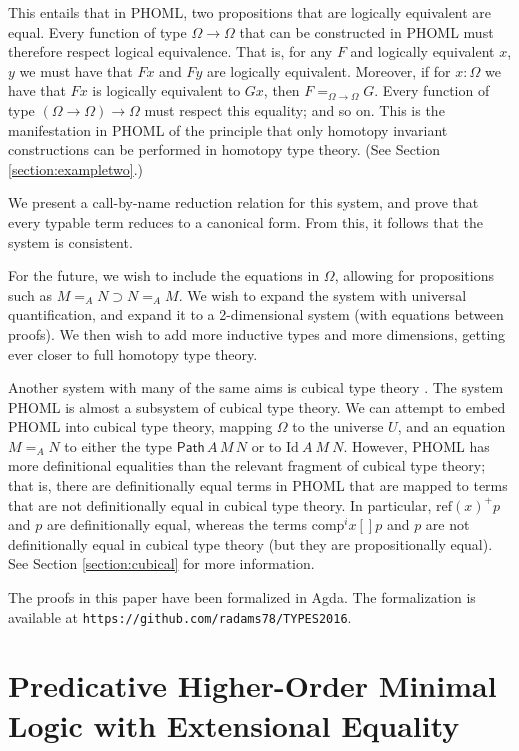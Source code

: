 \documentclass[a4paper,UKenglish]{lipics-v2016}
\newcommand*{\reff}[1]{\ensuremath{\mathrm{ref} \left( {#1} \right)}}
\newcommand{\Path}[3]{\ensuremath{\mathsf{Path} \, {#1} \, {#2} \, {#3}}}
\theoremstyle{plain}
\theoremstyle{definition}
\begin{document}
This entails that in PHOML, two propositions that are logically equivalent are equal.  Every function of type $\Omega \rightarrow \Omega$ that can be constructed in PHOML must therefore respect logical equivalence.  That is, for any $F$ and logically equivalent $x$, $y$ we must have that $Fx$ and $Fy$ are logically equivalent. Moreover, if for $x:\Omega$ we have that $Fx$ is logically equivalent to $Gx$, then $F =_{\Omega\to\Omega} G$.
Every function of type $(\Omega \rightarrow \Omega) \rightarrow \Omega$ must respect this equality; and so on.  This is the manifestation in PHOML of the principle that only homotopy invariant constructions can be performed in homotopy type theory.  (See Section \ref{section:exampletwo}.)

We present a call-by-name reduction relation for this system, and prove that every typable term reduces to a canonical form.  From this, it follows that the system is consistent.  

For the future, we wish to include the equations in $\Omega$, allowing for propositions such as $M =_A N \supset N =_A M$.  We wish to expand the system with universal quantification, and expand it to a 2-dimensional system (with equations between proofs).  We then wish to add more inductive types and more dimensions, getting ever closer to full homotopy type theory.

Another system with many of the same aims is cubical type theory \cite{cchm:cubical}.  The system PHOML is almost a subsystem of cubical type theory.  We can attempt to embed PHOML into cubical type theory,
mapping $\Omega$ to the universe $U$, and an equation $M =_A N$ to either the type $\Path{A}{M}{N}$ or to $\mathrm{Id}\ A\ M\ N$.  However, PHOML has more definitional equalities than the relevant fragment of cubical type theory; that is, there are definitionally equal terms in PHOML that are mapped to terms that are not definitionally equal in cubical type theory.  In particular, $\reff{x}^+ p$ and $p$ are definitionally equal, whereas the terms $\mathrm{comp}^i x [] p$ and $p$ are not definitionally equal in cubical type theory (but they are propositionally equal).  See Section \ref{section:cubical} for more information.

The proofs in this paper have been formalized in Agda.  The formalization is available at \texttt{https://github.com/radams78/TYPES2016}.

\section{Predicative Higher-Order Minimal Logic with Extensional Equality}
\end{document}
